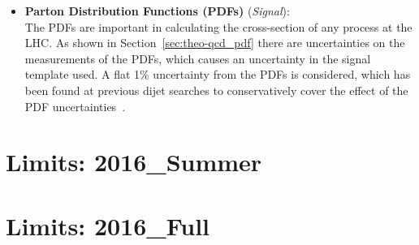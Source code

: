 \begin{itemize}[leftmargin=*]
\item\textbf{Parton Distribution Functions (PDFs) } \hspace{1mm}  (\textit{Signal}):\\
  The PDFs are important in calculating the cross-section of any process at the LHC.
  As shown in Section~\ref{sec:theo-qcd_pdf} there are uncertainties on the measurements of the PDFs,
  which causes an uncertainty in the signal template used.
  A flat 1\% uncertainty from the PDFs is considered,
  which has been found at previous dijet searches to conservatively cover
  the effect of the PDF uncertainties~\cite{dijet-mori16_paper}.
  \vspace{0.5em}
\end{itemize}

\section{Limits: 2016\_Summer}
\label{sec:lim-summer}

\section{Limits: 2016\_Full}
\label{sec:lim-full}
